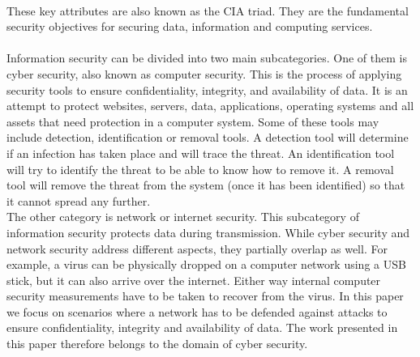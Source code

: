  ~~\\
 These key attributes are also known as the CIA triad. They are the fundamental security objectives for securing data, information and computing services. \\
 \\
Information security can be divided into two main subcategories. One of them is cyber security, also known as computer security. This is the process of applying security tools to ensure confidentiality, integrity, and availability of data. It is an attempt to protect websites, servers, data, applications, operating systems and all assets that need protection in a computer system.  Some of these tools may include detection, identification or removal tools. A detection tool will determine if an infection has taken place and will trace the threat. An identification tool will try to identify the threat to be able to know how to remove it. A removal tool will remove the threat from the system (once it has been identified) so that it cannot spread any further. \\
The other category is network or internet security. This subcategory of information security protects data during transmission. While cyber security and network security address different aspects, they partially overlap as well. For example, a virus can be physically dropped on a computer network using a USB stick, but it can also arrive over the internet. Either way internal computer security measurements have to be taken to recover from the virus. In this paper we focus on scenarios where a network has to be defended against attacks to ensure confidentiality, integrity and availability of data. The work presented in this paper therefore belongs to the domain of cyber security.





